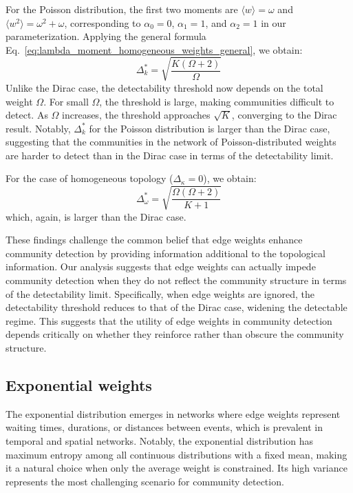 \documentclass[a4paper,pre,superscriptaddress,floatfix,nofootinbib,twocolumn]{revtex4-1}
\begin{document}
For the Poisson distribution, the first two moments are $\langle w \rangle = \omega$ and $\langle w^2 \rangle = \omega^2 + \omega$, corresponding to $\alpha_0 = 0$, $\alpha_1 = 1$, and $\alpha_2 = 1$ in our parameterization. Applying the general formula Eq.~\eqref{eq:lambda_moment_homogeneous_weights_general}, we obtain:
\begin{equation}
    \Delta_k^* = \sqrt{\frac{K \left( \Omega +2\right)}{\Omega}}
\label{eq:poisson_det}
\end{equation}
Unlike the Dirac case, the detectability threshold now depends on the total weight $\Omega$. For small $\Omega$, the threshold is large, making communities difficult to detect. As $\Omega$ increases, the threshold approaches $\sqrt{K}$, converging to the Dirac result.
Notably, $\Delta_k^*$ for the Poisson distribution is larger than the Dirac case,
suggesting that the communities in the network of Poisson-distributed weights are harder to detect than in the Dirac case in terms of the detectability limit.

For the case of homogeneous topology ($\Delta_{\kappa} = 0$), we obtain:
\begin{equation}
    \Delta_\omega^* = \sqrt{\frac{\Omega (\Omega +2)}{K + 1}}
\label{eq:poisson_w_det}
\end{equation}
which, again, is larger than the Dirac case.

These findings challenge the common belief that edge weights enhance community detection by providing information additional to the topological information. Our analysis suggests that edge weights can actually impede community detection when they do not reflect the community structure in terms of the detectability limit. Specifically, when edge weights are ignored, the detectability threshold reduces to that of the Dirac case, widening the detectable regime. This suggests that the utility of edge weights in community detection depends critically on whether they reinforce rather than obscure the community structure.

\subsection*{Exponential weights}

The exponential distribution emerges in networks where edge weights represent waiting times, durations, or distances between events, which is prevalent in temporal and spatial networks. Notably, the exponential distribution has maximum entropy among all continuous distributions with a fixed mean, making it a natural choice when only the average weight is constrained. Its high variance represents the most challenging scenario for community detection.
\end{document}
